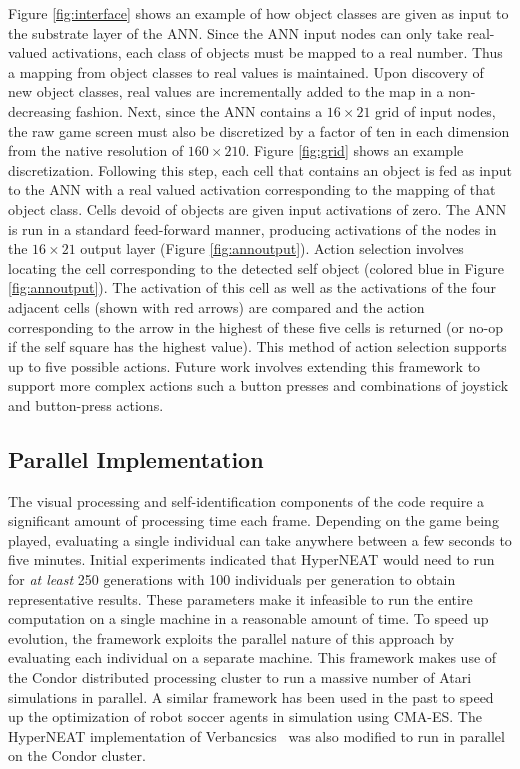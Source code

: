 \documentclass{sig-alternate}
\begin{document}
Figure \ref{fig:interface} shows an example of how object classes are given as input to the substrate layer of the ANN. Since the ANN input nodes can only take real-valued activations, each class of objects must be mapped to a real number. Thus a mapping from object classes to real values is maintained. Upon discovery of new object classes, real values are incrementally added to the map in a non-decreasing fashion. Next, since the ANN contains a $16\times 21$ grid of input nodes, the raw game screen must also be discretized by a factor of ten in each dimension from the native resolution of $160\times 210$. Figure \ref{fig:grid} shows an example discretization. Following this step, each cell that contains an object is fed as input to the ANN with a real valued activation corresponding to the mapping of that object class. Cells devoid of objects are given input activations of zero. The ANN is run in a standard feed-forward manner, producing activations of the nodes in the $16\times 21$ output layer (Figure \ref{fig:annoutput}). Action selection involves locating the cell corresponding to the detected self object (colored blue in Figure \ref{fig:annoutput}). The activation of this cell as well as the activations of the four adjacent cells (shown with red arrows) are compared and the action corresponding to the arrow in the highest of these five cells is returned (or no-op if the self square has the highest value). This method of action selection supports up to five possible actions. Future work involves extending this framework to support more complex actions such a button presses and combinations of joystick and button-press actions.

\subsection{Parallel Implementation}
\label{sec:condor}
The visual processing and self-identification components of the code require a significant amount of processing time each frame. Depending on the game being played, evaluating a single individual can take anywhere between a few seconds to five minutes. Initial experiments indicated that HyperNEAT would need to run for \textit{at least} 250 generations with 100 individuals per generation to obtain representative results. These parameters make it infeasible to run the entire computation on a single machine in a reasonable amount of time. To speed up evolution, the framework exploits the parallel nature of this approach by evaluating each individual on a separate machine. This framework makes use of the Condor distributed processing cluster \cite{thain2005distributed} to run a massive number of Atari simulations in parallel. A similar framework has been used in the past to speed up the optimization of robot soccer agents in simulation using CMA-ES\cite{Urieli+MKBS:2010}. The HyperNEAT implementation of Verbancsics~\cite{verbancsics10} was also modified to run in parallel on the Condor cluster.
\end{document}
